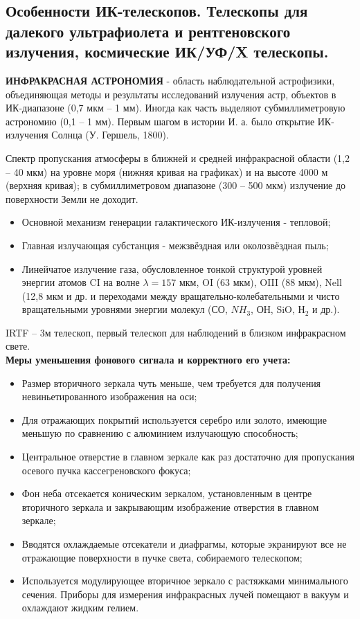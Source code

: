 \documentclass[12pt]{article}
\begin{document}
	\subsection{Особенности ИК-телескопов. Телескопы для далекого ультрафиолета и рентгеновского излучения, космические ИК/УФ/X телескопы.}
	
	\textbf{ИНФРАКРАСНАЯ АСТРОНОМИЯ} - область наблюдательной
	астрофизики, объединяющая методы и результаты исследований
	излучения астр, объектов в ИК-диапазоне (0,7 мкм -- 1 мм). Иногда
	как часть выделяют субмиллиметровую астрономию (0,1 -- 1 мм).
	Первым шагом в истории И. а. было открытие ИК-излучения
	Солнца (У. Гершель, 1800).
	
	Спектр пропускания атмосферы в
	ближней и средней инфракрасной
	области (1,2 -- 40 мкм) на уровне моря
	(нижняя кривая на графиках) и на
	высоте 4000 м (верхняя кривая);
	в субмиллиметровом диапазоне (300 --
	500 мкм) излучение до поверхности
	Земли не доходит.
	\begin{itemize}
		\item Основной механизм генерации галактического ИК-излучения - тепловой;
		\item Главная излучающая субстанция - межзвёздная или околозвёздная пыль;
		\item Линейчатое излучение газа, обусловленное тонкой структурой уровней энергии атомов
		CI на волне $\lambda =157$ мкм, OI (63 мкм), OIII (88 мкм), Nell (12,8 мкм и др. и переходами между
		вращательно-колебательными и чисто вращательными уровнями энергии молекул (СО, $NH_3$,
		ОН, SiO, $Н_2$ и др.).
	\end{itemize}
	
	IRTF -- 3м телескоп, первый телескоп для наблюдений в близком инфракрасном свете.\\
	\textbf{Меры уменьшения фонового сигнала и корректного его
		учета:}
	\begin{itemize}
		\item Размер вторичного зеркала чуть меньше, чем требуется для получения невиньетированного
		изображения на оси;
		\item Для отражающих покрытий используется серебро или золото,
		имеющие меньшую по сравнению с алюминием излучающую способность;
	\item	Центральное отверстие в главном зеркале как раз достаточно для пропускания осевого пучка
		кассегреновского фокуса;
	\item	Фон неба отсекается коническим зеркалом, установленным в центре вторичного зеркала и
		закрывающим изображение отверстия в главном зеркале;
	\item	Вводятся охлаждаемые отсекатели и диафрагмы, которые экранируют все не отражающие
		поверхности в пучке света, собираемого телескопом;
	\item	Используется модулирующее вторичное зеркало с растяжками минимального сечения.
		Приборы для измерения инфракрасных лучей помещают в вакуум и охлаждают жидким гелием.
	\end{itemize}
	
\end{document}
